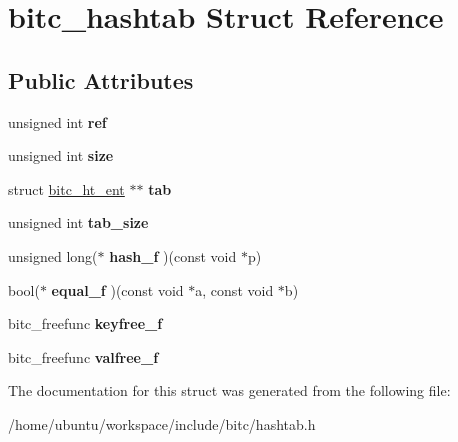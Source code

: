 \hypertarget{structbitc__hashtab}{\section{bitc\-\_\-hashtab Struct Reference}
\label{structbitc__hashtab}
}
\subsection*{Public Attributes}
\begin{DoxyCompactItemize}
\item 
\hypertarget{structbitc__hashtab_a0f7f598216b007a203b4df022a28a892}{unsigned int {\bfseries ref}}\label{structbitc__hashtab_a0f7f598216b007a203b4df022a28a892}

\item 
\hypertarget{structbitc__hashtab_a49fa49a0ad9f9e5599c366d94cc2c693}{unsigned int {\bfseries size}}\label{structbitc__hashtab_a49fa49a0ad9f9e5599c366d94cc2c693}

\item 
\hypertarget{structbitc__hashtab_a7839d075eadbaf4779b0e32e043bccf7}{struct \hyperlink{structbitc__ht__ent}{bitc\-\_\-ht\-\_\-ent} $\ast$$\ast$ {\bfseries tab}}\label{structbitc__hashtab_a7839d075eadbaf4779b0e32e043bccf7}

\item 
\hypertarget{structbitc__hashtab_a896979f4c5349c1a98bbeae7b48ccfbd}{unsigned int {\bfseries tab\-\_\-size}}\label{structbitc__hashtab_a896979f4c5349c1a98bbeae7b48ccfbd}

\item 
\hypertarget{structbitc__hashtab_a8a250fbaec3ffe90a8c490bea2f0fbbf}{unsigned long($\ast$ {\bfseries hash\-\_\-f} )(const void $\ast$p)}\label{structbitc__hashtab_a8a250fbaec3ffe90a8c490bea2f0fbbf}

\item 
\hypertarget{structbitc__hashtab_ae521f7b8ca30fe4aa0316c4f73a6c849}{bool($\ast$ {\bfseries equal\-\_\-f} )(const void $\ast$a, const void $\ast$b)}\label{structbitc__hashtab_ae521f7b8ca30fe4aa0316c4f73a6c849}

\item 
\hypertarget{structbitc__hashtab_a2020c462536884d655efe055a0d5a3f9}{bitc\-\_\-freefunc {\bfseries keyfree\-\_\-f}}\label{structbitc__hashtab_a2020c462536884d655efe055a0d5a3f9}

\item 
\hypertarget{structbitc__hashtab_a93787ddb1b8aaba7f906a0a6910689e3}{bitc\-\_\-freefunc {\bfseries valfree\-\_\-f}}\label{structbitc__hashtab_a93787ddb1b8aaba7f906a0a6910689e3}

\end{DoxyCompactItemize}


The documentation for this struct was generated from the following file\-:\begin{DoxyCompactItemize}
\item 
/home/ubuntu/workspace/include/bitc/hashtab.\-h\end{DoxyCompactItemize}
